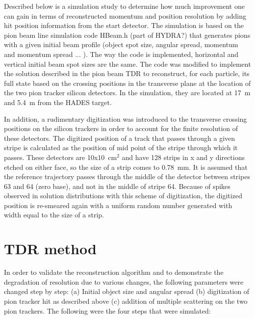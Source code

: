 \documentclass[20]{article}
\begin{document}


Described below is a simulation study to determine how much
improvement one can gain in terms of reconstructed momentum and
position resolution by adding hit position information from the start
detector. The simulation is based on the pion beam line simulation
code HBeam.h (part of HYDRA?) that generates pions with a given
initial beam profile (object spot size, angular spread, momentum and
momentum spread ... ). The way the code is implemented, horizontal and
vertical initial beam spot sizes are the same. The code was modified
to implement the solution described in the pion beam TDR to
reconstruct, for each particle, its full state based on the crossing
positions in the transverse plane at the location of the two pion
tracker silicon detectors. In the simulation, they are located at 17~m
and 5.4~m from the HADES target.

In addition, a rudimentary digitization was introduced to the
transverse crossing positions on the silicon trackers in order to
account for the finite resolution of these detectors. The digitized
position of a track that passes through a given stripe is calculated
as the position of mid point of the stripe through which it
passes. These detectors are 10x10~cm$^2$ and have 128 strips in x and
y directions etched on either face, so the size of a strip comes to
0.78~mm. It is assumed that the reference trajectory passes through
the middle of the detector between stripes 63 and 64 (zero base), and
not in the middle of stripe 64. Because of spikes observed in solution
distributions with this scheme of digitization, the digitized position
is re-smeared again with a uniform random number generated with width
equal to the size of a strip.

\section{TDR method}
In order to validate the reconstruction algorithm and to demonstrate
the degradation of resolution due to various changes, the following
parameters were changed step by step: (a) Initial object size and
angular spread (b) digitization of pion tracker hit as described above
(c) addition of multiple scattering on the two pion trackers. The
following were the four steps that were simulated:
\end{document}
